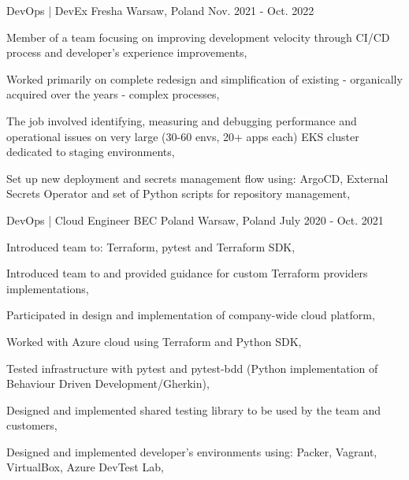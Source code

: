 \begin{cventries}
  \cventry
  {DevOps | DevEx } %
  {Fresha} %
  {Warsaw, Poland} %
  {Nov. 2021 - Oct. 2022} %
  {
    \begin{cvitems} %
      \item {Member of a team focusing on improving development velocity through CI/CD process and developer's experience improvements,}
      \item {Worked primarily on complete redesign and simplification of existing - organically acquired over the years - complex processes,}
      \item {The job involved identifying, measuring and debugging performance and operational issues on very large (30-60 envs, 20+ apps each) EKS cluster dedicated to staging environments,}
      \item {Set up new deployment and secrets management flow using: ArgoCD, External Secrets Operator and set of Python scripts for repository management,}
    \end{cvitems}
  }

  \cventry
  {DevOps | Cloud Engineer} %
  {BEC Poland} %
  {Warsaw, Poland} %
  {July 2020 - Oct. 2021} %
  {
    \begin{cvitems} %
      \item {Introduced team to: Terraform, pytest and Terraform SDK,}
      \item {Introduced team to and provided guidance for custom Terraform providers implementations,}
      \item {Participated in design and implementation of company-wide cloud platform,}
      \item {Worked with Azure cloud using Terraform and Python SDK,}
      \item {Tested infrastructure with pytest and pytest-bdd (Python implementation of Behaviour Driven Development/Gherkin),}
      \item {Designed and implemented shared testing library to be used by the team and customers,}
      \item {Designed and implemented developer's environments using: Packer, Vagrant, VirtualBox, Azure DevTest Lab,}
    \end{cvitems}
  }


\end{cventries}
